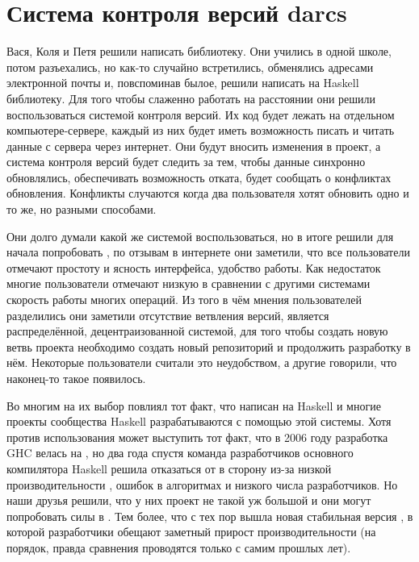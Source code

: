 

\section{Система контроля версий darcs}

Вася, Коля и Петя решили написать библиотеку. Они учились
в одной школе, потом разъехались, но как-то случайно
встретились, обменялись адресами электронной почты
и, повспоминав былое, решили написать на Haskell библиотеку.
Для того чтобы слаженно работать на расстоянии они
решили воспользоваться системой контроля версий. Их код
будет лежать на отдельном компьютере-сервере, каждый из
них будет иметь возможность писать и читать данные с сервера
через интернет. Они будут вносить изменения в проект,
а система контроля версий будет следить за тем, чтобы
данные синхронно обновлялись, обеспечивать возможность
отката, будет сообщать о конфликтах обновления. Конфликты
случаются когда два пользователя хотят обновить одно и то
же, но разными способами. 

Они долго думали какой же системой воспользоваться, 
но в итоге решили для начала попробовать , 
по отзывам в интернете они заметили, что все пользователи
отмечают простоту и ясность интерфейса, удобство работы. 
Как недостаток многие пользователи отмечают низкую
в сравнении с другими системами скорость работы многих
операций. Из того в чём мнения пользователей разделились
они заметили отсутствие ветвления версий,  
является распределённой, децентраизованной системой, 
для того чтобы создать новую ветвь проекта необходимо
создать новый репозиторий и продолжить разработку в нём. 
Некоторые пользователи считали это неудобством, а другие
говорили, что  наконец-то такое появилось.

Во многим на их выбор повлиял тот факт, что 
написан на Haskell и многие проекты сообщества Haskell
разрабатываются с помощью этой системы. Хотя против 
использования  может выступить тот факт, что в 2006
году разработка GHC велась на , но два года спустя
команда разработчиков основного компилятора Haskell решила отказаться
от  в сторону  из-за низкой производительности
, ошибок в алгоритмах и низкого числа разработчиков.
Но наши друзья решили, что у них проект не такой уж большой
и они могут попробовать силы в . Тем более,
что с тех пор вышла новая стабильная версия ,
в которой разработчики  обещают заметный прирост
производительности (на порядок, правда сравнения проводятся 
только с самим  прошлых лет).

